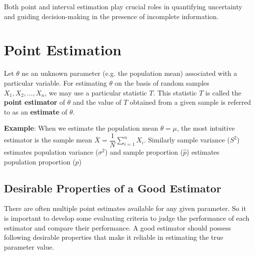 \documentclass[twoside]{book}
\begin{document}
Both point and interval estimation play crucial roles in quantifying uncertainty and guiding decision-making in the presence of incomplete information.


\section{Point Estimation}
Let $\theta$ ne an unknown parameter (e.g. the population mean) associated with a particular variable. For estimating $\theta$ on the basis of random samples $X_1, X_2, \dots, X_n$, we may use a particular statistic $ T $. This statistic $T$ is called the \textbf{point estimator} of $\theta$ and the value of $T$ obtained from a given sample is referred to as an \textbf{estimate} of $\theta$.

\textbf{Example}: When we estimate the population mean $\theta = \mu$, the most intuitive estimator is the sample mean $\overline{X} = \dfrac{1}{N}\sum_{i=1}^{n}X_i$. Similarly sample variance (\( S^2 \)) estimates population variance (\( \sigma^2 \)) and sample proportion (\( \hat{p} \)) estimates population proportion (\( p \))


\subsection{Desirable Properties of a Good Estimator}
There are often multiple point estimates available for any given parameter. So it is important to develop some evaluating criteria to judge the performance of each estimator and compare their performance. A good estimator should possess following desirable properties that make it reliable in estimating the true parameter value.
\end{document}
